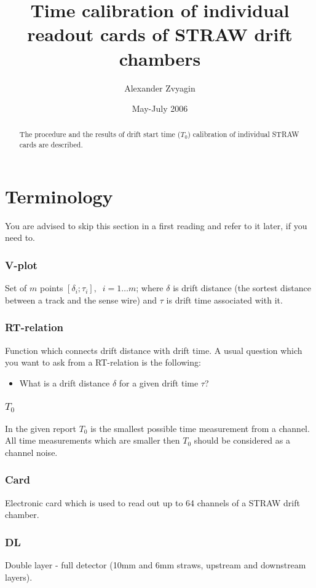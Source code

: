\documentclass[a4paper,12pt]{article}
\author{Alexander Zvyagin}
\title{Time calibration of individual readout cards of STRAW drift chambers}
\date{May-July 2006}
\begin{document}
\maketitle

    \begin{abstract}
        The procedure and the results of drift start time ($T_0$) calibration
        of individual STRAW cards are described.
    \end{abstract}

\tableofcontents

\section{Terminology}
You are advised to skip this section in a first reading and refer to it later,
if you need to.
\subsubsection*{V-plot}
Set of $m$ points $[\delta_i;\tau_i],\;\;i=1\dots m$; where $\delta$ is drift
distance (the sortest distance between a track and the sense wire) and $\tau$
is drift time associated with it.
\subsubsection*{RT-relation}
Function which connects drift distance with drift time. A usual
question which you want to ask from a RT-relation is the following:
\begin{itemize}
\item What is a drift distance $\delta$ for a given drift time $\tau$?
\end{itemize}
\subsubsection*{$T_0$}
In the given report $T_0$ is the smallest possible time measurement from a
channel. All time measurements which are smaller then $T_0$ should be
considered as a channel noise.
\subsubsection*{Card}
Electronic card which is used to read out up to 64 channels of a STRAW
drift chamber.
\subsubsection*{DL}
Double layer - full detector (10mm and 6mm straws, upstream and downstream layers).
\end{document}
